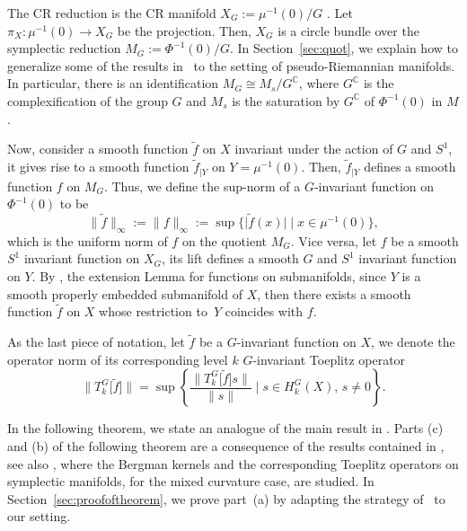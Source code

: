 \documentclass[pdftex]{sigma}
\numberwithin{equation}{section}
\begin{document}
	 The CR reduction is the CR manifold $X_G:=\mu^{-1}(0)/G$ \cite{hsiaohuang}. Let $\pi_X \colon \mu^{-1}(0) \rightarrow X_G$ be the projection. Then, $X_G$ is a circle bundle over the symplectic reduction $M_G:=\Phi^{-1}(0)/G$. In Section~\ref{sec:quot}, we explain how to generalize some of the results in~\cite{gs} to the setting of pseudo-Riemannian manifolds. In particular, there is an identification
	 $ M_G\cong M_s/G^{\mathbb{C}}$,
	 where $G^{\mathbb{C}}$ is the complexification of the group $G$ and $M_s$ is the saturation by $G^{\mathbb{C}}$ of $\Phi^{-1}(0)$ in $M$.
	
	 Now, consider a smooth function $\widetilde{f}$ on $X$ invariant under the action of $G$ and $S^1$, it gives rise to a smooth function $\widetilde{f}_{\vert Y}$ on $Y=\mu^{-1}(0)$. Then, $\widetilde{f}_{\vert Y}$ defines a smooth function $f$ on $M_G$. Thus, we define the sup-norm of a $G$-invariant function on $\Phi^{-1}(0)$ to be
	 \[%
	 	\big\lVert \widetilde{f}\big\rVert_{\infty} :=\lVert f\rVert_{\infty} := \sup\big\{ \big\lvert \widetilde f(x)\big\rvert \mid x \in \mu^{-1}(0)\big\},
	 \]
	 which is the uniform norm of $f$ on the quotient $M_G$. Vice versa, let $f$ be a smooth $S^1$ invariant function on $X_G$, its lift defines a smooth $G$ and $S^1$ invariant function on $Y$. By \cite[Lemma~5.34\,(b)]{lee}, the extension Lemma for functions on submanifolds, since $Y$ is a smooth properly embedded submanifold of $X$, then there exists a smooth function $\widetilde{f}$ on $X$ whose restriction to~$Y$ coincides with $f$.
	
	 As the last piece of notation, let $\widetilde{f}$ be a $G$-invariant function on $X$, we denote the operator norm of its corresponding level $k$ $G$-invariant Toeplitz operator
	 \begin{equation} \label{eq:opn}\big\lVert T^{G}_{k}\big[\widetilde{f}\big] \big\rVert=\sup \left\{\frac{\lVert T^G_k\big[\widetilde{f}\big]s\rVert}{\lVert s\rVert} \mid s\in H^{G}_k(X) ,\, s\neq 0\right\} .
	 \end{equation}
	
	 In the following theorem, we state an analogue of the main result in \cite{bms}. Parts (c) and (b) of the following theorem are a consequence of the results contained in \cite{gh}, see also \cite{mm,mmt}, where the Bergman kernels and the corresponding Toeplitz operators on symplectic manifolds, for the mixed curvature case, are studied. In Section~\ref{sec:proofoftheorem}, we prove part~(a) by adapting the strategy of~\cite{schl2} to our setting.
	
\end{document}
